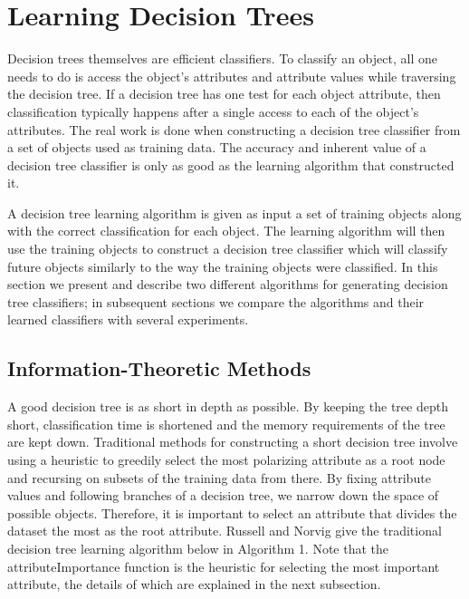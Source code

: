 \documentclass[12pt, letterpaper]{article}
\begin{document}
\section{Learning Decision Trees}
Decision trees themselves are efficient classifiers.  To classify an object,
all one needs to do is access the object's attributes and attribute values
while traversing the decision tree.  If a decision tree has one test
for each object attribute, then classification typically happens after a single
access to each of the object's attributes.  The real work is done when 
constructing a decision tree classifier from a set of objects used as training
data.  The accuracy and inherent value of a decision tree classifier is only as 
good as the learning algorithm that constructed it.

A decision tree learning algorithm is given as input a set of training objects 
along with the correct classification for each object.  The learning algorithm will
then use the training objects to construct a decision tree classifier which will classify
future objects similarly to the way the training objects were classified.
In this section we present and describe two different algorithms for generating decision
tree classifiers; in subsequent sections we compare the algorithms and their learned 
classifiers with several experiments.


\subsection{Information-Theoretic Methods}

A good decision tree is as short in depth as possible.  By keeping the tree
depth short, classification time is shortened and the memory requirements of
the tree are kept down.  Traditional methods for constructing a short decision
tree involve using a heuristic to greedily select the most polarizing attribute as a root node
and recursing on subsets of the training data from there\cite{Russell}.
By fixing attribute values and following branches of a decision tree, we narrow down the space of possible
objects. Therefore, it is important to select an attribute that divides the dataset the most
as the root attribute.  Russell 
and Norvig give the traditional decision tree learning algorithm below in Algorithm 1. Note that 
the attributeImportance function is the heuristic for selecting the most important
attribute, the details of which are explained in the next subsection. 
\end{document}
